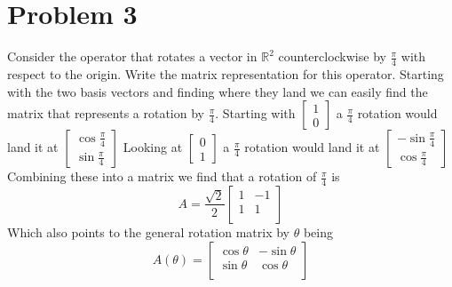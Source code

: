 \documentclass{article}
\begin{document}
\section*{Problem 3}
Consider the operator that rotates a vector in $\mathbb{R}^2$ counterclockwise by $\frac{\pi}{4}$ with respect to the origin.
Write the matrix representation for this operator.
\newline
\newline
Starting with the two basis vectors and finding where they land we can easily find the matrix that represents a rotation by $\frac{\pi}{4}$.
Starting with
$ \begin{bmatrix} 1 \\ 0 \end{bmatrix}$
a $\frac{\pi}{4}$ rotation would land it at
$ \begin{bmatrix} \cos{\frac{\pi}{4}} \\ \sin{\frac{\pi}{4}} \end{bmatrix}$
Looking at
$ \begin{bmatrix} 0 \\ 1 \end{bmatrix}$
a $\frac{\pi}{4}$ rotation would land it at
$ \begin{bmatrix} -\sin{\frac{\pi}{4}} \\ \cos{\frac{\pi}{4}} \end{bmatrix}$
Combining these into a matrix we find that a rotation of $\frac{\pi}{4}$ is
$$ A =
\frac{\sqrt{2}}{2}
\begin{bmatrix}
1 & -1 \\
1 & 1 \\
\end{bmatrix}
$$
Which also points to the general rotation matrix by $\theta$ being
$$ A(\theta) =
\begin{bmatrix}
\cos{\theta} & -\sin{\theta} \\
\sin{\theta} & \cos{\theta} \\
\end{bmatrix}
$$
\end{document}
